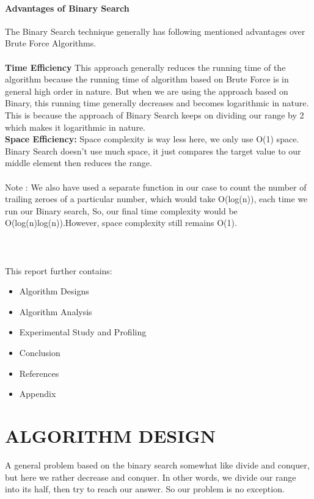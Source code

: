 \documentclass[10pt]{article}
\begin{document}
\begin{multicols*}{2}
\paragraph{Advantages of Binary Search}
The Binary Search technique generally has following mentioned advantages over Brute Force Algorithms.\\\\
\textbf{Time Efficiency} This approach generally reduces the running time of the algorithm because the running time of algorithm based on Brute Force is in general high order in nature. But when we are using the approach based on Binary, this running time generally decreases and becomes logarithmic in nature. This is because the approach of Binary Search keeps on dividing our range by 2 which makes it logarithmic in nature.\\
\textbf{Space Efficiency:} Space complexity is way less here, we only use O(1) space. Binary Search doesn't use much space, it just compares the target value to our middle element then reduces the range.\\\\
Note : We also have used a separate function in our case to count the number of trailing zeroes of a particular number, which would take O(log(n)), each time we run our Binary search, So, our final time complexity would be O(log(n)log(n)).However, space complexity still remains O(1).
\\\\\\\\This report further contains:
\begin{itemize}
\item 	Algorithm  Designs
\item 	Algorithm  Analysis
\item 	Experimental Study and Profiling
\item 	Conclusion
\item 	References
\item 	Appendix
\end{itemize}

\section*{ALGORITHM DESIGN}
A general problem based on the binary search somewhat like divide and conquer, but here we rather decrease and conquer. In other words, we divide our range into its half, then try to reach our answer. So our problem is no exception.


\end{multicols*}
\end{document}
